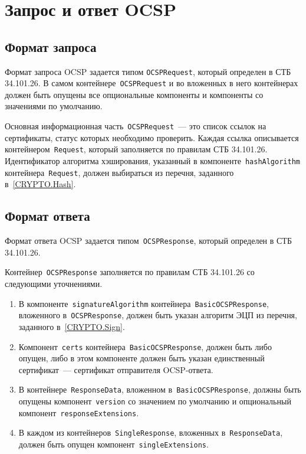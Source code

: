 \section{Запрос и ответ OCSP}\label{FMT.OCSP}

\subsection{Формат запроса}

Формат запроса OCSP задается типом \texttt{OCSPRequest}, который определен 
в СТБ 34.101.26. В самом контейнере~\texttt{OCSPRequest} и во вложенных в него
контейнерах должен быть опущены все опциональные компоненты и компоненты 
со значениями по умолчанию.

Основная информационная часть~\texttt{OCSPRequest}~--- это список ссылок
на сертификаты, статус которых необходимо проверить.
%
Каждая ссылка описывается контейнером~\texttt{Request}, который заполняется
по правилам СТБ 34.101.26. Идентификатор алгоритма хэширования, указанный в
компоненте~\texttt{hashAlgorithm} контейнера~\texttt{Request}, должен
выбираться из перечня, заданного в~\ref{CRYPTO.Hash}.

\subsection{Формат ответа}

Формат ответа OCSP задается типом~\texttt{OCSPResponse}, который определен 
в СТБ 34.101.26. 

Контейнер~\texttt{OCSPResponse} заполняется по правилам СТБ 34.101.26
со следующими уточнениями.

\begin{enumerate}
\item
В компоненте~\texttt{signatureAlgorithm} 
контейнера~\texttt{BasicOCSPResponse}, вложенного   
в~\texttt{OCSPResponse}, должен быть указан алгоритм ЭЦП
из перечня, заданного в~\ref{CRYPTO.Sign}.

\item
Компонент~\texttt{certs} контейнера~\texttt{BasicOCSPResponse}, 
должен быть либо опущен, либо в этом компоненте должен быть указан 
единственный сертификат~--- сертификат отправителя OCSP-ответа.

\item
В контейнере~\texttt{ResponseData}, вложенном 
в~\texttt{BasicOCSPResponse}, должны быть опущены 
компонент~\texttt{version} со значением по умолчанию
и опциональный компонент~\texttt{responseExtensions}.

\item
В каждом из контейнеров~\texttt{SingleResponse}, вложенных
в~\texttt{ResponseData}, должен быть опущен 
компонент~\texttt{singleExtensions}.
\end{enumerate}
